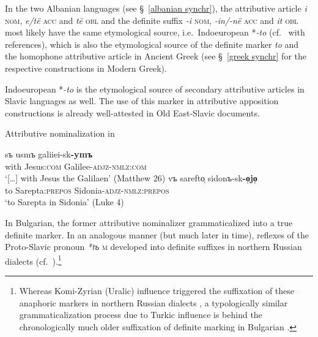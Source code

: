 {In the two Albanian languages (see \S~\ref{albanian synchr}), the attributive article \textit{i} \textsc{nom}, \textit{e/të} \textsc{acc} and \textit{të} \textsc{obl} and the definite suffix \textit{-i} \textsc{nom}, \textit{-in/-në} \textsc{acc} and \textit{it} \textsc{obl} most likely have the same etymological source, i.e.~Indoeuropean *\textit{-to} (cf.~\citet[165]{himmelmann1997} with references), which is also the etymological source of the definite marker \textit{to} and the homophone attributive article in Ancient Greek (see \S~\ref{greek synchr} for the respective constructions in Modern Greek).

Indoeuropean *\textit{-to} is the etymological source of secondary attributive articles in Slavic languages as well. The use of this marker in attributive apposition constructions is already well-attested in Old East-Slavic documents.
\begin{exe}
\ex Attributive nominalization in \\
\begin{xlist}
\ex
\gll	[\dots] sъ usmъ galiiei-sk\textbf{-ymъ}\\
	{ } with Jesus:\textsc{com} Galilee-\textsc{adjz}-\textsc{nmlz:com}\\
\glt 	‘[\dots] with Jesus the Galilaen’ (Matthew 26)
\ex 
\gll	vъ sarefto̜ sidonъ-sk\textbf{-o̜jo̜}\\
	to Sarepta:\textsc{prepos} Sidonia-\textsc{adjz}-\textsc{nmlz:prepos}\\
\glt 	‘to Sarepta in Sidonia’ (Luke 4)
\end{xlist}
\end{exe}
In Bulgarian, the former attributive nominalizer grammaticalized into a true definite marker. In an analogous manner (but much later in time), reflexes of the Proto-Slavic pronoun \textit{*tъ} \textsc{m} developed into definite suffixes in northern Russian dialects (cf.~\citealt
{leinonen2006a}).\footnote{Whereas Komi-Zyrian (Uralic) influence triggered the suffixation of these anaphoric markers in northern Russian dialects \citep
{leinonen2006a}, a typologically similar grammaticalization process due to Turkic influence is behind the chronologically much older suffixation of definite marking in Bulgarian \citep[114–122]{kusmenko2008}.}

}
